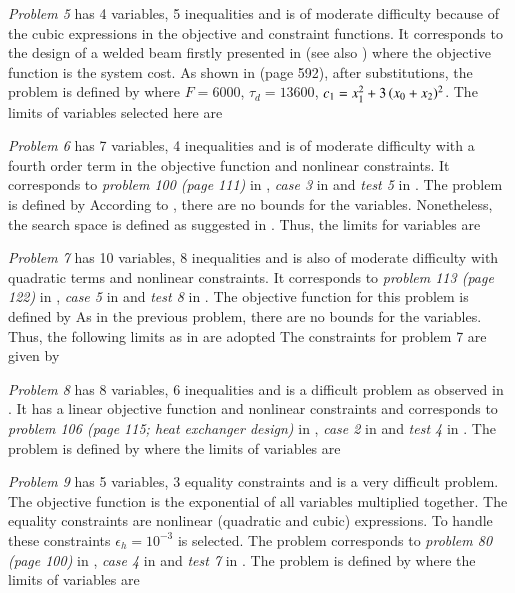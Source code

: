 \documentclass[final,5p,times,twocolumn]{elsarticle}
\begin{document}
\emph{Problem 5} has 4 variables, 5 inequalities and is of moderate difficulty because of the cubic
expressions in the objective and constraint functions. It corresponds to the design of a welded beam
firstly presented in \citep{rags:76} (see also \citep{ravi:07}) where the objective function is the
system cost. As shown in \citep{ravi:07} (page 592), after substitutions, the problem is defined by
\OptmProbFiveA
where $F=6000$, $\tau_d=13600$, $c_1=x_{1}^2 + 3 \, (x_{0}+x_{2})^2$. The limits of variables selected here are
\OptmProbFiveX


\emph{Problem 6} has 7 variables, 4 inequalities and is of moderate difficulty with a fourth order
term in the objective function and nonlinear constraints. It corresponds to
\emph{problem 100 (page 111)} in \citep{hock:81},
\emph{case 3} in \citep{mich:95} and 
\emph{test 5} in \citep{deb:00}.
The problem is defined by
\OptmProbSix
According to \citep{hock:81}, there are no bounds for the variables. Nonetheless, the search
space is defined as suggested in \citep{mich:95,deb:00}. Thus, the limits for variables are
\OptmProbSixX


\emph{Problem 7} has 10 variables, 8 inequalities and is also of moderate difficulty with quadratic
terms and nonlinear constraints. It corresponds to
\emph{problem 113 (page 122)} in \citep{hock:81},
\emph{case 5} in \citep{mich:95} and
\emph{test 8} in \citep{deb:00}.
The objective function for this problem is defined by
\OptmProbSevenA
As in the previous problem, there are no bounds for the variables. Thus, the following limits as in
\citep{mich:95,deb:00} are adopted
\OptmProbSevenX
The constraints for problem 7 are given by
\OptmProbSevenB


\emph{Problem 8} has 8 variables, 6 inequalities and is a difficult problem as observed in
\citep{mich:96,deb:00}. It has a linear objective function and nonlinear constraints and corresponds
to
\emph{problem 106 (page 115; heat exchanger design)} in \citep{hock:81},
\emph{case 2} in \citep{mich:95} and
\emph{test 4} in \citep{deb:00}.
The problem is defined by
\OptmProbEight
where the limits of variables are
\OptmProbEightX


\emph{Problem 9} has 5 variables, 3 equality constraints and is a very difficult problem. The
objective function is the exponential of all variables multiplied together. The equality constraints
are nonlinear (quadratic and cubic) expressions. To handle these constraints $\epsilon_h=10^{-3}$
is selected. The problem corresponds to
\emph{problem 80 (page 100)} in \citep{hock:81},
\emph{case 4} in \citep{mich:95} and
\emph{test 7} in \citep{deb:00}.
The problem is defined by
\OptmProbNine
where the limits of variables are
\OptmProbNineX
\end{document}
